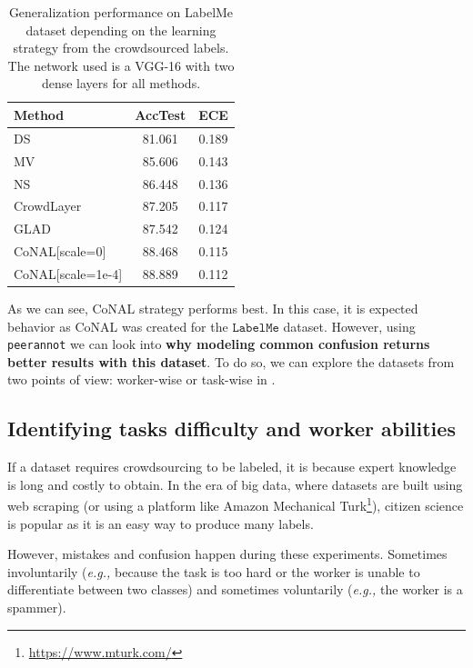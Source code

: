 \begin{table}[tbh]
    \centering
    \begin{tabular}{|l|c|c|}
    \hline
    \rowcolor{gray!20}
    \textbf{Method} & \textbf{AccTest} & \textbf{ECE} \\
    \hline
    DS & 81.061 & 0.189 \\
    MV & 85.606 & 0.143 \\
    NS & 86.448 & 0.136 \\
    CrowdLayer & 87.205 & 0.117 \\
    GLAD & 87.542 & 0.124 \\
    CoNAL[scale=0] & 88.468 & 0.115 \\
    \cellcolor{green!20}CoNAL[scale=1e-4] & \cellcolor{green!20}88.889 & \cellcolor{green!20}0.112 \\
    \hline
    \end{tabular}
    \caption{Generalization performance on LabelMe dataset depending on the learning strategy from the crowdsourced labels. The network used is a VGG-16 with two dense layers for all methods.}
    \label{tav:perf-labelme}
    \end{table}

As we can see, CoNAL strategy performs best.
In this case, it is expected behavior as CoNAL was created for the $\texttt{LabelMe}$ dataset.
However, using \texttt{peerannot} we can look into \textbf{why modeling common confusion returns better results with this dataset}.
To do so, we can explore the datasets from two points of view: worker-wise or task-wise in .

\subsection{Identifying tasks difficulty and worker abilities}
\label{subsec:exploration}

If a dataset requires crowdsourcing to be labeled, it is because expert knowledge is long and costly to obtain. In the era of big data, where datasets are built using web scraping (or using a platform like Amazon Mechanical Turk\footnote{\url{https://www.mturk.com/}}), citizen science is popular as it is an easy way to produce many labels.


However, mistakes and confusion happen during these experiments.
Sometimes involuntarily (\emph{e.g.,} because the task is too hard or the worker is unable to differentiate between two classes) and sometimes voluntarily (\emph{e.g.,} the worker is a spammer).

